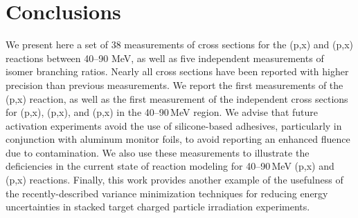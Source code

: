          





 
 
 
 
 \section{Conclusions}

We present here a set of 38 measurements of cross sections for the (p,x) and  (p,x) reactions between 40--90 MeV, as well as five independent measurements of isomer branching ratios.
Nearly all cross sections have been reported with higher precision than previous measurements.
We report the first measurements of the  (p,x) reaction, as well as the first measurement of the independent cross sections for    (p,x), (p,x), and (p,x) in the 40--90\,MeV region.
We advise that future activation experiments avoid the use of silicone-based adhesives, particularly in conjunction with aluminum monitor foils, to avoid reporting an enhanced fluence due to  contamination.
We also use these measurements to illustrate the deficiencies in the current state of  reaction modeling for 40--90\,MeV (p,x) and  (p,x) reactions.
Finally, this work provides another example of the usefulness of the recently-described variance minimization techniques for reducing energy uncertainties in stacked target charged particle irradiation experiments.
